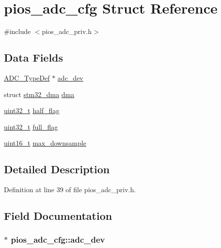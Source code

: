 \hypertarget{structpios__adc__cfg}{\section{pios\-\_\-adc\-\_\-cfg Struct Reference}
\label{structpios__adc__cfg}
}


{\ttfamily \#include $<$pios\-\_\-adc\-\_\-priv.\-h$>$}

\subsection*{Data Fields}
\begin{DoxyCompactItemize}
\item 
\hyperlink{struct_a_d_c___type_def}{A\-D\-C\-\_\-\-Type\-Def} $\ast$ \hyperlink{structpios__adc__cfg_a71e6f79b37c468407fb343f5acb763df}{adc\-\_\-dev}
\item 
struct \hyperlink{structstm32__dma}{stm32\-\_\-dma} \hyperlink{structpios__adc__cfg_a290c06e429c8f00e3047f4d3583fc08e}{dma}
\item 
\hyperlink{stdint_8h_a435d1572bf3f880d55459d9805097f62}{uint32\-\_\-t} \hyperlink{structpios__adc__cfg_a51e37a0e22f7eebdf167c3bfe3454178}{half\-\_\-flag}
\item 
\hyperlink{stdint_8h_a435d1572bf3f880d55459d9805097f62}{uint32\-\_\-t} \hyperlink{structpios__adc__cfg_aab7eae753f1347fc6092b34a49109cac}{full\-\_\-flag}
\item 
\hyperlink{stdint_8h_a273cf69d639a59973b6019625df33e30}{uint16\-\_\-t} \hyperlink{structpios__adc__cfg_af589b8712695ad7294d4e9f94007b241}{max\-\_\-downsample}
\end{DoxyCompactItemize}


\subsection{Detailed Description}


Definition at line 39 of file pios\-\_\-adc\-\_\-priv.\-h.



\subsection{Field Documentation}
\hypertarget{structpios__adc__cfg_a71e6f79b37c468407fb343f5acb763df}{
\subsubsection[{adc\-\_\-dev}]{$\ast$ pios\-\_\-adc\-\_\-cfg\-::adc\-\_\-dev}}\label{structpios__adc__cfg_a71e6f79b37c468407fb343f5acb763df}


